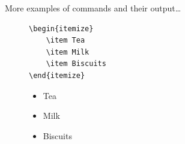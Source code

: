 \begin{frame}[fragile]{More examples of commands and their output\ldots}

    \begin{figure}[h]
        \centering
        \begin{minipage}{0.5\textwidth}
            \begin{lstlisting}[showlines=true]
\begin{itemize}
    \item Tea
    \item Milk
    \item Biscuits
\end{itemize}
            \end{lstlisting}
        \end{minipage}
        \begin{minipage}{0.4\textwidth}
            \begin{itemize}
                \item Tea
                \item Milk
                \item Biscuits
            \end{itemize}
        \end{minipage}
    \end{figure}



\end{frame}
